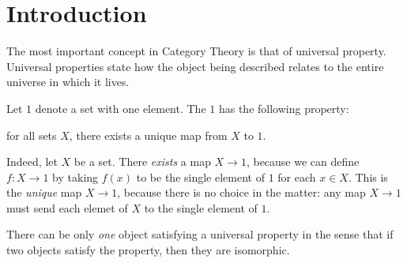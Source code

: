 \section{Introduction}
The most important concept in Category Theory is that of universal property. Universal properties state how the object being described relates to the entire universe in which it lives.

\begin{example}
    Let $1$ denote a set with one element. The $1$ has the following property:
\end{example}
\begin{center}
for all sets $X$, there exists a unique map from $X$ to $1$.
\end{center}
Indeed, let $X$ be a set. There \textit{exists} a map $X\to 1$, because we can define $f:X\to 1$ by taking $f(x)$ to be the single element of $1$ for each $x\in X$. This is the \textit{unique} map $X\to 1$, because there is no choice in the matter: any map $X\to 1$ must send each elemet of $X$ to the single element of $1$.

There can be only \textit{one} object satisfying a universal property in the sense that if two objects satisfy the property, then they are isomorphic.
